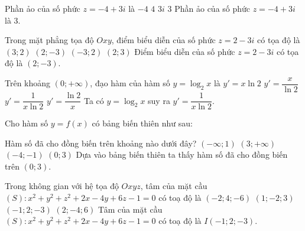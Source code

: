 \begin{ex}%
Phần ảo của số phức $z=-4+3i$ là
\choice
{$-4$}
{$4$}
{$3i$}
{\True $3$}
\loigiai
{Phần ảo của số phức $z=-4+3i$ là $3$.
}
\end{ex}

\begin{ex}%
Trong mặt phẳng tọa độ $Oxy$, điểm biểu diễn của số phức $z=2-3i$ có tọa độ là
\choice
{$(3;2)$}
{\True $(2;-3)$}
{$(-3;2)$}
{$(2;3)$}
\loigiai
{Điểm biểu diễn của số phức $z=2-3i$ có tọa độ là $(2;-3)$.
}
\end{ex}

\begin{ex}%
Trên khoảng $(0;+\infty)$, đạo hàm của hàm số $y=\log_2 x$ là
\choice
{$y'=x\ln2$}
{$y'=\dfrac{x}{\ln2}$}
{\True $y'=\dfrac{1}{x\ln2}$}
{$y'=\dfrac{\ln2}{x}$}
\loigiai
{Ta có $y=\log_2 x$ suy ra $y'=\dfrac{1}{x\ln2}$.
}
\end{ex}

\begin{ex}%
Cho hàm số $y=f(x)$ có bảng biến thiên như sau:
\begin{center}
\end{center}
Hàm số đã cho đồng biến trên khoảng nào dưới đây?
\choice
{$(-\infty;1)$}
{$(3;+\infty)$}
{$(-4;-1)$}
{\True $(0;3)$}
\loigiai
{Dựa vào bảng biến thiên ta thấy hàm số đã cho đồng biến trên $(0;3)$.
}
\end{ex}

\begin{ex}%
Trong không gian với hệ tọa độ $O x y z$, tâm của mặt cầu $(S)\colon x^2+y^2+z^2+2 x-4 y+6 z-1=0$ có toạ độ là
\choice
{$(-2 ; 4 ;-6)$}
{$(1 ;-2 ; 3)$}
{\True $(-1 ; 2 ;-3)$}
{$(2 ;-4 ; 6)$}
\loigiai
{
Tâm của mặt cầu $(S)\colon x^2+y^2+z^2+2 x-4 y+6 z-1=0$ có toạ độ là $I(-1;2;-3)$.
}
\end{ex}

